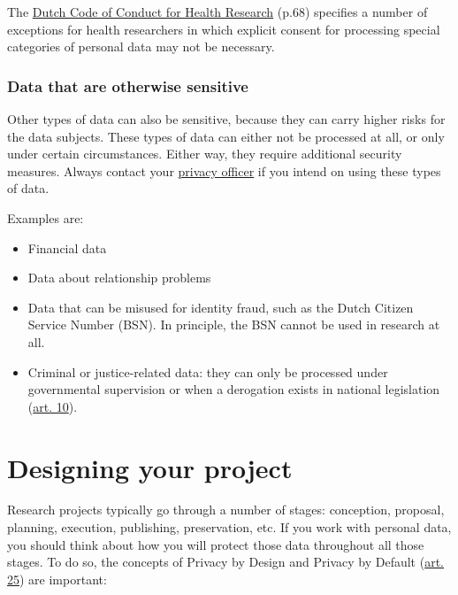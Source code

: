 \documentclass[
]{book}
\providecommand{\tightlist}{%
  \setlength{\itemsep}{0pt}\setlength{\parskip}{0pt}}
\begin{document}
The \href{https://www.coreon.org/wp-content/uploads/2022/01/Gedragscode-Gezondheidsonderzoek-2022.pdf}{Dutch Code of Conduct for Health Research}
(p.68) specifies a number of exceptions for health researchers in which explicit
consent for processing special categories of personal data may not be necessary.

\hypertarget{data-that-are-otherwise-sensitive}{%
\subsection{Data that are otherwise sensitive}\label{data-that-are-otherwise-sensitive}}

Other types of data can also be sensitive, because they can carry higher risks
for the data subjects. These types of data can either not be processed at all,
or only under certain circumstances. Either way, they require additional
security measures. Always contact your \protect\hyperlink{support}{privacy officer}
if you intend on using these types of data.

Examples are:

\begin{itemize}
\tightlist
\item
  Financial data
\item
  Data about relationship problems
\item
  Data that can be misused for identity fraud, such as the Dutch Citizen
  Service Number (BSN). In principle, the BSN cannot be used in research at all.
\item
  Criminal or justice-related data: they can only be processed under
  governmental supervision or when a derogation exists in national legislation
  (\href{https://gdpr-info.eu/art-10-gdpr/}{art. 10}).
\end{itemize}

\hypertarget{privacy-by-design}{%
\chapter{Designing your project}\label{privacy-by-design}}

Research projects typically go through a number of stages: conception, proposal,
planning, execution, publishing, preservation, etc. If you work with personal
data, you should think about how you will protect those data throughout all
those stages. To do so, the concepts of Privacy by Design and Privacy by Default
(\href{https://gdpr-info.eu/art-25-gdpr/}{art. 25}) are
important:
\end{document}
